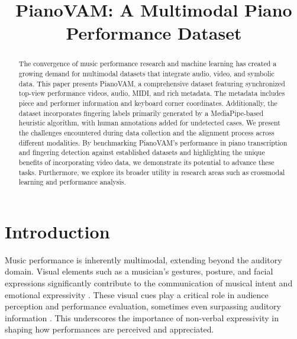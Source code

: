 \documentclass{article}
\title{PianoVAM: A Multimodal Piano Performance Dataset}
\begin{document}
\maketitle

\begin{abstract}

The convergence of music performance research and machine learning has created a growing demand for multimodal datasets that integrate audio, video, and symbolic data. This paper presents PianoVAM, a comprehensive dataset featuring synchronized top-view performance videos, audio, MIDI, and rich metadata. The metadata includes piece and performer information and keyboard corner coordinates. Additionally, the dataset incorporates fingering labels primarily generated by a MediaPipe-based heuristic algorithm, with human annotations added for undetected cases. We present the challenges encountered during data collection and the alignment process across different modalities. 
By benchmarking PianoVAM's performance in piano transcription and fingering detection against established datasets and highlighting the unique benefits of incorporating video data, we demonstrate its potential to advance these tasks. Furthermore, we explore its broader utility in research areas such as crossmodal learning and performance analysis. 
\end{abstract}

\section{Introduction}\label{sec:introduction}
Music performance is inherently multimodal, extending beyond the auditory domain. Visual elements such as a musician's gestures, posture, and facial expressions significantly contribute to the communication of musical intent and emotional expressivity \cite{ISMIR24Choi, MP07Dahl, PsychMusic09Broughton, Thompson2005}. These visual cues play a critical role in audience perception and performance evaluation, sometimes even surpassing auditory information \cite{Moura2023, Tsay2013}. This underscores the importance of non-verbal expressivity in shaping how performances are perceived and appreciated.
\end{document}

